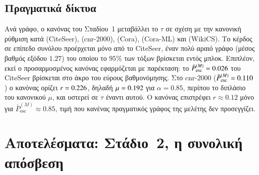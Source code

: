 \documentclass[11pt,a4paper]{article}
\theoremstyle{definition}
\theoremstyle{remark}
\newcommand{\Pbar}{\bar P^{(M)}_{\mathrm{esc}}}
\begin{document}
\subsection{Πραγματικά δίκτυα}
Ανά γράφο, ο κανόνας του Σταδίου~1 μεταβάλλει το $\tau$ σε σχέση με την κανονική ρύθμιση κατά
\SOneRealCiteseer{} (CiteSeer), \SOneRealCnr{} (cnr-2000), \SOneRealCorafull{} (Cora), \SOneRealCoraml{}
(Cora-ML) και \SOneRealWikics{} (WikiCS). Το κέρδος σε επίπεδο συνόλου προέρχεται μόνο από το CiteSeer,
έναν πολύ αραιό γράφο (μέσος βαθμός εξόδου $1.27$) του οποίου το $95\%$ των τόξων βρίσκεται εντός μπλοκ.
Επιπλέον, εκεί ο προσαρμοσμένος κανόνας εφαρμόζεται με παρέκταση: το $\Pbar=\PbarCiteseer$ του CiteSeer
βρίσκεται στο άκρο του εύρους βαθμονόμησης. Στο cnr-2000 ($\Pbar=\PbarCnr$) ο κανόνας ορίζει
$r=0.226$, δηλαδή $\mu=0.192$ για $\alpha=0.85$, περίπου το διπλάσιο του κανονικού $\mu$, και
υστερεί σε $\tau$ έναντι αυτού. Ο κανόνας επιστρέφει $r\approx0.12$ μόνο για $\Pbar\approx0.85$, τιμή
που κανένας πραγματικός γράφος της μελέτης δεν προσεγγίζει.

\FloatBarrier
\section{Αποτελέσματα: Στάδιο~2, η συνολική απόσβεση}
\label{sec:res2}
\end{document}
